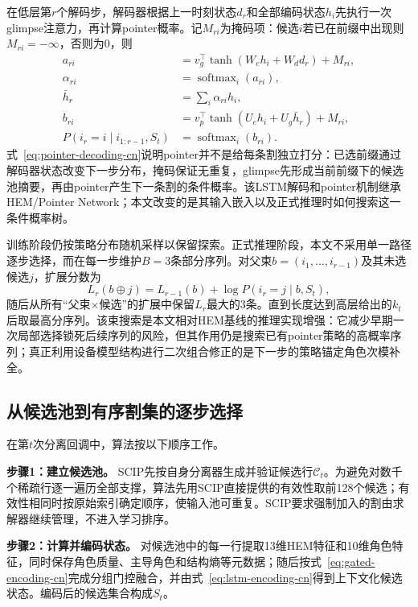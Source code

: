 \documentclass[final,5p,times,twocolumn]{elsarticle}
\begin{document}
在低层第$r$个解码步，解码器根据上一时刻状态$d_r$和全部编码状态$h_i$先执行一次glimpse注意力，再计算pointer概率。记$M_{ri}$为掩码项：候选$i$若已在前缀中出现则$M_{ri}=-\infty$，否则为0，则
\begin{equation}
\begin{aligned}
a_{ri}&=v_g^\top\tanh(W_e h_i+W_d d_r)+M_{ri},\\
\alpha_{ri}&=\operatorname{softmax}_i(a_{ri}),\\
\bar h_r&=\sum_i\alpha_{ri}h_i,\\
b_{ri}&=v_p^\top\tanh(U_e h_i+U_g\bar h_r)+M_{ri},\\
P(i_r=i\mid i_{1:r-1},S_t)&=\operatorname{softmax}_i(b_{ri}).
\end{aligned}
\label{eq:pointer-decoding-cn}
\end{equation}
式~\eqref{eq:pointer-decoding-cn}说明pointer并不是给每条割独立打分：已选前缀通过解码器状态改变下一步分布，掩码保证无重复，glimpse先形成当前前缀下的候选池摘要，再由pointer产生下一条割的条件概率。该LSTM解码和pointer机制继承HEM/Pointer Network；本文改变的是其输入嵌入以及正式推理时如何搜索这一条件概率树。

训练阶段仍按策略分布随机采样以保留探索。正式推理阶段，本文不采用单一路径逐步选择，而在每一步维护$B=3$条部分序列。对父束$b=(i_1,\ldots,i_{r-1})$及其未选候选$j$，扩展分数为
\begin{equation}
L_r(b\oplus j)=L_{r-1}(b)+\log P(i_r=j\mid b,S_t),
\label{eq:beam-score-cn}
\end{equation}
随后从所有“父束$\times$候选”的扩展中保留$L_r$最大的3条。直到长度达到高层给出的$k_t$后取最高分序列。该束搜索是本文相对HEM基线的推理实现增强：它减少早期一次局部选择锁死后续序列的风险，但其作用仍是搜索已有pointer策略的高概率序列；真正利用设备模型结构进行二次组合修正的是下一步的策略锚定角色次模补全。

\subsection{从候选池到有序割集的逐步选择}

在第$t$次分离回调中，算法按以下顺序工作。

\noindent\textbf{步骤1：建立候选池。} SCIP先按自身分离器生成并验证候选行$\mathcal C_t$。为避免对数千个稀疏行逐一遍历全部支撑，算法先用SCIP直接提供的有效性取前128个候选；有效性相同时按原始索引确定顺序，使输入池可重复。SCIP要求强制加入的割由求解器继续管理，不进入学习排序。

\noindent\textbf{步骤2：计算并编码状态。} 对候选池中的每一行提取13维HEM特征和10维角色特征，同时保存角色质量、主导角色和结构熵等元数据；随后按式~\eqref{eq:gated-encoding-cn}完成分组门控融合，并由式~\eqref{eq:lstm-encoding-cn}得到上下文化候选状态。编码后的候选集合构成$S_t$。
\end{document}
